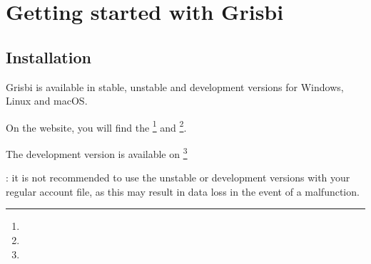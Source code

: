 

\chapter{Getting started with Grisbi\label{start}}


\section{Installation\label{start-install}}

Grisbi is available in stable, unstable and development versions for Windows, Linux and macOS.

\noindent
On the  website, you will find the \footnote{\urlSourceForgeGrisbiStable} and \footnote{\urlSourceForgeGrisbiInstable}.

\noindent
The development version is available on \footnote{\urlGitHubGrisbi}

\noindent
\Attention{}: it is not recommended to use the unstable or development versions with your regular account file, as this may result in data loss in the event of a malfunction.

